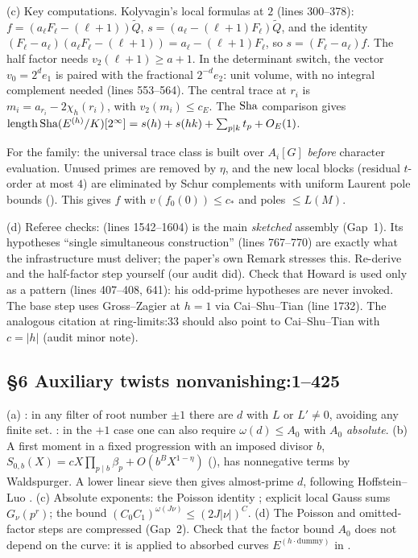 \documentclass[11pt]{article}
\theoremstyle{remark}
\newcommand{\Sha}{\text{\rm Sha}}
\DeclareMathOperator{\length}{length}
\newcommand{\src}[2]{\textsf{\small #1:#2}}
\begin{document}
(c) Key computations. Kolyvagin's local formulas at $2$ (lines 300--378):
$f=(a_\ell F_\ell-(\ell+1))\widetilde Q$,
$s=(a_\ell-(\ell+1)F_\ell)\widetilde Q$, and the identity
$(F_\ell-a_\ell)(a_\ell F_\ell-(\ell+1))=a_\ell-(\ell+1)F_\ell$, so
$s=(F_\ell-a_\ell)f$. The half factor needs $v_2(\ell+1)\ge a+1$. In the
determinant switch, the vector $v_0=2^de_1$ is paired with the fractional
$2^{-d}e_2$: unit volume, with no integral complement needed
(lines 553--564). The central trace at $r_i$ is $m_i=a_{r_i}-2\chi_h(r_i)$,
with $v_2(m_i)\le c_E$. The $\Sha$ comparison
 gives
$\length\Sha(E^{(h)}/K)[2^\infty]=s(h)+s(hk)+\sum_{p\mid k}t_p+O_E(1)$.

For the family: the universal trace class is built over $A_i[G]$
\emph{before} character evaluation. Unused primes are removed by $\eta$, and
the new local blocks (residual $t$-order at most $4$) are eliminated by Schur
complements with uniform Laurent pole bounds (). This gives
$f$ with $v(f_0(0))\le c_*$ and poles $\le L(M)$.

(d) Referee checks:  (lines 1542--1604) is the main
\emph{sketched} assembly (Gap~1). Its hypotheses ``single simultaneous
construction'' (lines 767--770) are exactly what the infrastructure must
deliver; the paper's own Remark  stresses this.
Re-derive  and the half-factor step yourself (our audit
did). Check that Howard is used only as a pattern (lines 407--408, 641):
his odd-prime hypotheses are never invoked. The base step uses Gross--Zagier
at $h=1$ via Cai--Shu--Tian (line 1732). The analogous citation at
\src{ring-limits}{33} should also point to Cai--Shu--Tian with $c=|h|$
(audit minor note).

\subsection*{\S6 Auxiliary twists \hfill \src{nonvanishing}{1--425}}
(a) : in any filter of root number $\pm1$ there are
$d$ with $L$ or $L'\ne0$, avoiding any finite set. : in the
$+1$ case one can also require $\omega(d)\le A_0$ with $A_0$
\emph{absolute}.
(b) A first moment in a fixed progression with an imposed divisor $b$,
$S_{0,b}(X)=cX\prod_{p\mid b}\beta_p+O(b^BX^{1-\eta})$ (),
has nonnegative terms by Waldspurger. A lower linear sieve
\cite[Thm.~11.13]{FriedlanderIwaniec2010} then gives almost-prime $d$,
following Hoffstein--Luo \cite{HoffsteinLuo1997}.
(c) Absolute exponents: the Poisson identity ; explicit
local Gauss sums $G_\nu(p^r)$; the bound $(C_0C_1)^{\omega(J\nu)}\le(2J|\nu|)^C$.
(d) The Poisson and omitted-factor steps are compressed (Gap~2). Check that
the factor bound $A_0$ does not depend on the curve: it is applied to
absorbed curves $E^{(h\cdot\text{dummy})}$ in .
\end{document}
